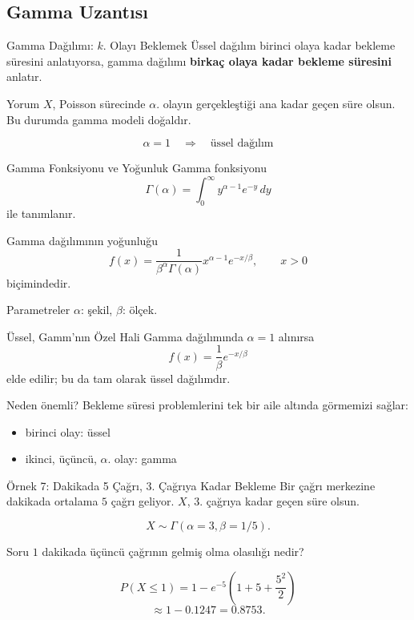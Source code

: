 \documentclass[light]{lutbeamer}
\begin{document}
\subsection{Gamma Uzantısı}

\begin{frame}{Gamma Dağılımı: \(k\). Olayı Beklemek}
    \small
    Üssel dağılım birinci olaya kadar bekleme süresini anlatıyorsa,
    gamma dağılımı \textbf{birkaç olaya kadar bekleme süresini} anlatır.

    \begin{block}{Yorum}
        \(X\), Poisson sürecinde \(\alpha\). olayın gerçekleştiği ana kadar geçen süre olsun.
        Bu durumda gamma modeli doğaldır.
    \end{block}

    \[
    \alpha=1 \quad \Rightarrow \quad \text{üssel dağılım}
    \]
\end{frame}

\begin{frame}{Gamma Fonksiyonu ve Yoğunluk}
    \small
    Gamma fonksiyonu
    \[
    \Gamma(\alpha)=\int_0^\infty y^{\alpha-1}e^{-y}\,dy
    \]
    ile tanımlanır.

    Gamma dağılımının yoğunluğu
    \[
    f(x)=\frac{1}{\beta^\alpha \Gamma(\alpha)}x^{\alpha-1}e^{-x/\beta},
    \qquad x>0
    \]
    biçimindedir.

    \begin{alertblock}{Parametreler}
        \(\alpha\): şekil, \qquad \(\beta\): ölçek.
    \end{alertblock}
\end{frame}

\begin{frame}{Üssel, Gamm'nın Özel Hali}
    \small
    Gamma dağılımında \(\alpha=1\) alınırsa
    \[
    f(x)=\frac{1}{\beta}e^{-x/\beta}
    \]
    elde edilir; bu da tam olarak üssel dağılımdır.

    \begin{block}{Neden önemli?}
        Bekleme süresi problemlerini tek bir aile altında görmemizi sağlar:
        \begin{itemize}
            \item birinci olay: üssel
            \item ikinci, üçüncü, \(\alpha\). olay: gamma
        \end{itemize}
    \end{block}
\end{frame}

\begin{frame}{Örnek 7: Dakikada 5 Çağrı, 3. Çağrıya Kadar Bekleme}
    \small
    Bir çağrı merkezine dakikada ortalama \(5\) çağrı geliyor. \(X\), \(3\). çağrıya kadar geçen süre olsun.

    \[
    X \sim \Gamma(\alpha=3,\beta=1/5).
    \]

    \begin{block}{Soru}
        \(1\) dakikada üçüncü çağrının gelmiş olma olasılığı nedir?
    \end{block}

    \[
    P(X\le 1)=1-e^{-5}\left(1+5+\frac{5^2}{2}\right)
    \]
    \[
    \approx 1-0.1247=0.8753.
    \]
\end{frame}
\end{document}
